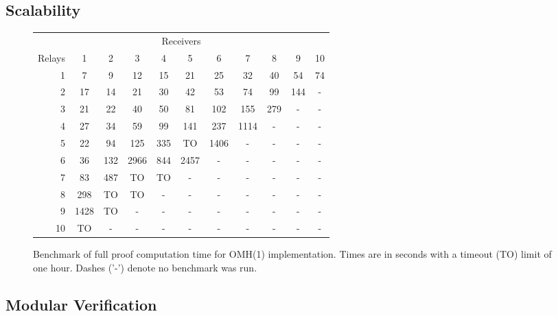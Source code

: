 \documentclass{llncs/llncs}
\newcommand{\lee}[1]{ } %
\newcommand{\lee}[1]{ {\color{blue}$<$lee: #1$>$} } %
\begin{document}
\subsection{Scalability}

\begin{figure}
  \centering
  \begin{tabular}{r||c|c|c|c|c|c|c|c|c|c|}
      \multicolumn{11}{c}{Receivers} \\
      \cline{2-11}
   Relays &   1  &  2  &   3  &  4  &   5  &  6   &  7   &  8  &  9  &  10 \\
      \hline \hline
      1   & 7    & 9   & 12   & 15  & 21   & 25   & 32   & 40  & 54  & 74  \\
      \hline
      2   & 17   & 14  & 21   & 30  & 42   & 53   & 74   & 99  & 144 & -   \\
      \hline
      3   & 21   & 22  & 40   & 50  & 81   & 102  & 155  & 279 & -   & -   \\
      \hline
      4   & 27   & 34  & 59   & 99  & 141  & 237  & 1114 & -   & -   & -   \\
      \hline
      5   & 22   & 94  & 125  & 335 & TO   & 1406 & -    & -   & -   & -   \\
      \hline
      6   & 36   & 132 & 2966 & 844 & 2457 & -    & -    & -   & -   & -   \\
      \hline
      7   & 83   & 487 & TO   & TO  & -    & -    & -    & -   & -   & -   \\
      \hline
      8   & 298  & TO  & TO   & -   & -    & -    & -    & -   & -   & -   \\
      \hline
      9   & 1428 & TO  & -    & -   & -    & -    & -    & -   & -   & -   \\
      \hline
     10   & TO   & -   & -    & -   & -    & -    & -    & -   & -   & -   \\
      \hline
  \end{tabular}
  \label{fig:benchmark}
  \caption{Benchmark of full proof computation time for OMH(1) implementation. Times are in seconds with a timeout (TO) limit of one hour. Dashes ('-') denote no benchmark was run.}
\end{figure}

\lee{let's also check out scalability when we ``turn off'' faults. Also, how hard is it to turn them off or change the fault model? E.g., how many lines of spec need to be changed? Compare to rushby's?}


\subsection{Modular Verification}
\end{document}
